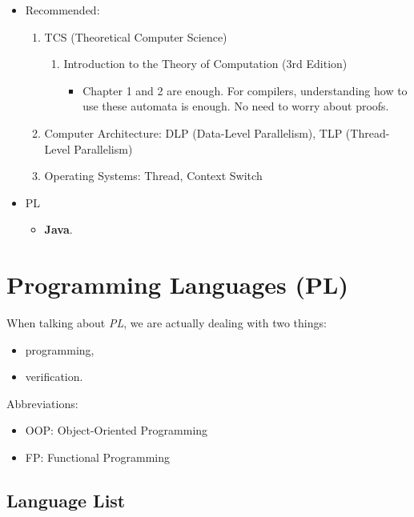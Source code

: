 \documentclass{article}
\begin{document}
\begin{enumerate}
\begin{itemize}
\begin{enumerate}
    \end{enumerate}
        \item Recommended:
        \begin{enumerate}
            \item TCS (Theoretical Computer Science)
            \begin{enumerate}
            \item Introduction to the Theory of Computation (3rd Edition) \cite{sipser1996introduction}
            \begin{itemize}
                \item Chapter 1 and 2 are enough.
                For compilers, understanding how to use these automata is enough.
                No need to worry about proofs.
            \end{itemize}
        \end{enumerate}
            \item Computer Architecture: DLP (Data-Level Parallelism), TLP (Thread-Level Parallelism)
            \item Operating Systems: Thread, Context Switch
        \end{enumerate}
        \item PL
        \begin{itemize}
            \item \textbf{Java}.
        \end{itemize}
    \end{itemize}
\end{enumerate}

\section{Programming Languages (PL)}

When talking about \emph{PL}, we are actually dealing with two things:
\begin{itemize}
    \item programming,
    \item verification.
\end{itemize}

\noindent Abbreviations:
\begin{itemize}
    \item OOP: Object-Oriented Programming
    \item FP: Functional Programming
\end{itemize}

\subsection{Language List}
\end{document}

